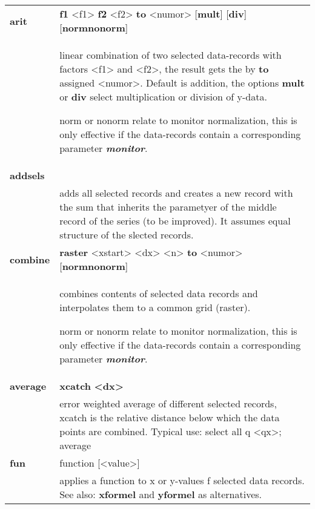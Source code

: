 \documentclass[]{article}
\begin{document}
\begin{longtable}[]{@{}ll@{}}
\toprule
\endhead
\textbf{arit} & \textbf{f1} \textless{}f1\textgreater{} \textbf{f2}
\textless{}f2\textgreater{} \textbf{to} \textless{}numor\textgreater{}
{[}\textbf{mult}{]} {[}\textbf{div}{]}
{[}\textbf{norm}\textbar{}\textbf{nonorm}{]}\tabularnewline
\begin{minipage}[t]{0.47\columnwidth}\raggedright
\strut
\end{minipage} & \begin{minipage}[t]{0.47\columnwidth}\raggedright
linear combination of two selected data-records with factors
\textless{}f1\textgreater{} and \textless{}f2\textgreater{}, the result
gets the by \textbf{to} assigned \textless{}numor\textgreater{}. Default
is addition, the options \textbf{mult} or \textbf{div} select
multiplication or division of y-data.

norm or nonorm relate to monitor normalization, this is only effective
if the data-records contain a corresponding parameter
\emph{\textbf{monitor}}.\strut
\end{minipage}\tabularnewline
\textbf{addsels} &\tabularnewline
& adds all selected records and creates a new record with the sum that
inherits the parametyer of the middle record of the series (to be
improved). It assumes equal structure of the slected
records.\tabularnewline
\textbf{combine} & \textbf{raster} \textless{}xstart\textgreater{}
\textless{}dx\textgreater{} \textless{}n\textgreater{} \textbf{to}
\textless{}numor\textgreater{}
{[}\textbf{norm}\textbar{}\textbf{nonorm}{]}\tabularnewline
\begin{minipage}[t]{0.47\columnwidth}\raggedright
\strut
\end{minipage} & \begin{minipage}[t]{0.47\columnwidth}\raggedright
combines contents of selected data records and interpolates them to a
common grid (raster).

norm or nonorm relate to monitor normalization, this is only effective
if the data-records contain a corresponding parameter
\emph{\textbf{monitor}}.\strut
\end{minipage}\tabularnewline
\textbf{average} & \textbf{xcatch}
\textbf{\textless{}dx\textgreater{}}\tabularnewline
& error weighted average of different selected records, xcatch is the
relative distance below which the data points are combined. Typical use:
select all q \textless{}qx\textgreater{}; average\tabularnewline
\textbf{fun} & function
{[}\textless{}value\textgreater{}{]}\tabularnewline
\begin{minipage}[t]{0.47\columnwidth}\raggedright
\strut
\end{minipage} & \begin{minipage}[t]{0.47\columnwidth}\raggedright
applies a function to x or y-values f selected data records. See also:
\textbf{xformel} and \textbf{yformel} as alternatives.


\end{minipage}
\end{longtable}
\end{document}
